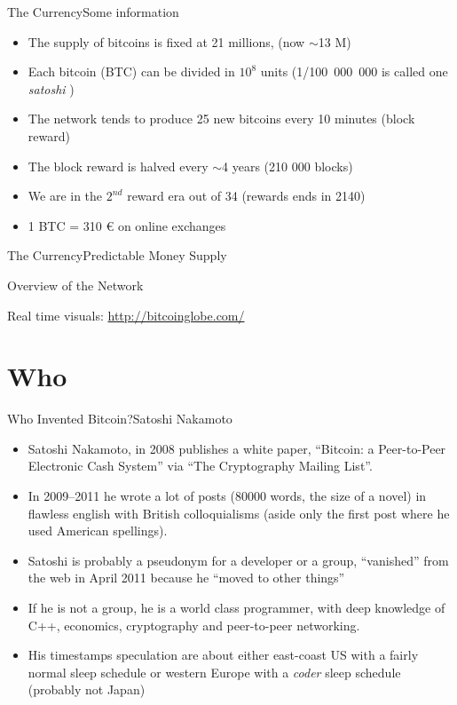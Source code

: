 \documentclass[english,compress]{beamer}
\newcommand{\challenge}{\pgfuseimage{challenge}}
\begin{document}
\begin{frame}{The Currency}{Some information}
 \begin{itemize}
  \item The supply of bitcoins is fixed at 21 millions, (now $\sim$13 M)
  \item Each bitcoin (BTC) can be divided in $10^8$ units (\mbox{1/100 000 000} is called one \emph{satoshi} )
  \item The network tends to produce 25 new bitcoins every 10 minutes (block reward)
  \item The block reward is halved every $\sim$4 years (210 000 blocks)
  \item We are in the $2^{nd}$ reward era out of 34 (rewards ends in 2140)
  \item 1 BTC = 310 € on online exchanges
 \end{itemize}

\end{frame}

\begin{frame}{The Currency}{Predictable Money Supply}
\end{frame}

\begin{frame}{Overview of the Network}


\begin{scriptsize}Real time visuals: \url{http://bitcoinglobe.com/}\end{scriptsize}
\end{frame}

\section{Who}

\begin{frame}{Who Invented Bitcoin?}{Satoshi Nakamoto}

\begin{scriptsize}\begin{itemize}
\item Satoshi Nakamoto, in 2008 publishes a white paper, ``Bitcoin: a Peer-to-Peer Electronic Cash System'' via ``The Cryptography Mailing List''.
 \item In 2009--2011 he wrote a lot of posts (80000 words, the size of a novel) in flawless english with British colloquialisms (aside only the first post where he used American spellings).
 \item Satoshi is probably a pseudonym for a developer or a group, “vanished” from the web in April 2011 because he “moved to other things” 
 \item If he is not a group, he is a world class programmer, with deep knowledge of C++, economics, cryptography and peer-to-peer networking.
 \item His timestamps speculation are about either east-coast US with a fairly normal sleep schedule or western Europe with a \emph{coder} sleep schedule (probably not Japan)
\end{itemize}\end{scriptsize}

\challenge
\end{frame}
\end{document}
